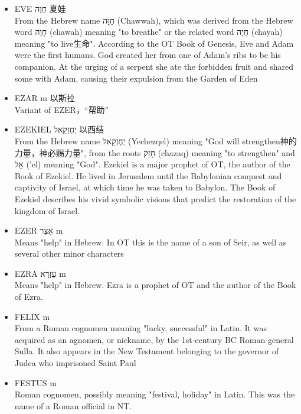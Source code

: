 \begin{itemize}
\item {EVE חַוָּה 夏娃}\\
From the Hebrew name חַוָּה (Chawwah), which was derived from the Hebrew word חָוָה (chawah) meaning "to breathe" or the related word חָיָה (chayah) meaning "to live生命". According to the OT Book of Genesis, Eve and Adam were the first humans. God created her from one of Adam's ribs to be his companion. At the urging of a serpent she ate the forbidden fruit and shared some with Adam, causing their expulsion from the Garden of Eden

\item {EZAR m 以斯拉}\\
Variant of EZER，“帮助”

\item {EZEKIEL יְחֶזְקֵאל 以西结}\\
From the Hebrew name יְחֶזְקֵאל (Yechezqel) meaning "God will strengthen神的力量，神必赐力量", from the roots חָזַק (chazaq) meaning "to strengthen" and אֵל ('el) meaning "God". Ezekiel is a major prophet of OT, the author of the Book of Ezekiel. He lived in Jerusalem until the Babylonian conquest and captivity of Israel, at which time he was taken to Babylon. The Book of Ezekiel describes his vivid symbolic visions that predict the restoration of the kingdom of Israel.

\item {EZER אֵצֶר m}\\
Means "help" in Hebrew. In OT this is the name of a son of Seir, as well as several other minor characters

\item {EZRA עֶזְרָא m}\\
Means "help" in Hebrew. Ezra is a prophet of OT and the author of the Book of Ezra. 

\item {FELIX m} \\
From a Roman cognomen meaning "lucky, successful" in Latin. It was acquired as an agnomen, or nickname, by the 1st-century BC Roman general Sulla. It also appears in the New Testament belonging to the governor of Judea who imprisoned Saint Paul

\item {FESTUS m}\\
Roman cognomen, possibly meaning "festival, holiday" in Latin. This was the name of a Roman official in NT.
\end{itemize}


